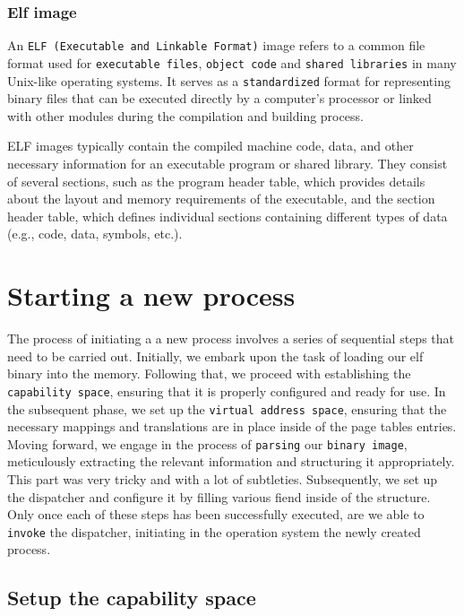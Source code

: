 \subsubsection{Elf image}

An \texttt{ELF (Executable and Linkable Format)} image refers to a common file format used for \texttt{executable files}, \texttt{object code} and \texttt{shared libraries} in many Unix-like operating systems. It serves as a \texttt{standardized} format for representing binary files that can be executed directly by a computer's processor or linked with other modules during the compilation and building process.

ELF images typically contain the compiled machine code, data, and other necessary information for an executable program or shared library. They consist of several sections, such as the program header table, which provides details about the layout and memory requirements of the executable, and the section header table, which defines individual sections containing different types of data (e.g., code, data, symbols, etc.).

\section{Starting a new process}

The process of initiating a a new process involves a series of sequential steps that need to be carried out. Initially, we embark upon the task of loading our elf binary into the memory. Following that, we proceed with establishing the \texttt{capability space}, ensuring that it is properly configured and ready for use. In the subsequent phase, we set up the \texttt{virtual address space}, ensuring that the necessary mappings and translations are in place inside of the page tables entries. Moving forward, we engage in the process of \texttt{parsing} our \texttt{binary image}, meticulously extracting the relevant information and structuring it appropriately. This part was very tricky and with a lot of subtleties. Subsequently, we set up the dispatcher and configure it by filling various fiend inside of the structure. Only once each of these steps has been successfully executed, are we able to \texttt{invoke} the dispatcher, initiating in the operation system the newly created process.

\subsection{Setup the capability space}


